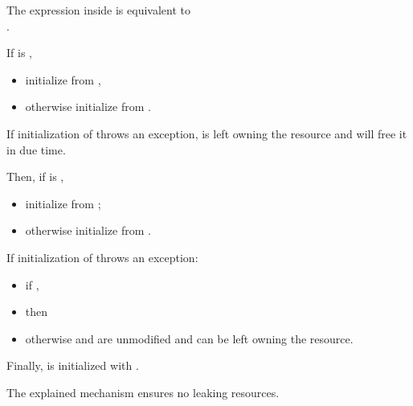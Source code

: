 \documentclass[ebook,11pt,article]{memoir}
\begin{document}
\begin{itemdescr}
\pnum
\remarks
The expression inside  is equivalent to \\
 \tcode{\&\&} .

\pnum
\effects If  is , 
\begin{itemize}
\item
initialize  from 
, %
\item otherwise initialize  from .  
\end{itemize}

\pnum
\begin{note}
If initialization of  throws an exception,  is left owning the resource and will free it in due time.
\end{note}

\pnum
Then, 
if  is ,
\begin{itemize}
\item initialize  from ;
\item otherwise initialize  from . 
\end{itemize}

\pnum
If initialization of  throws an exception: 
\begin{itemize}
\item
if , 
\item
then  
\item
otherwise  and  are unmodified 
and  can be left owning the resource. 
\end{itemize}

\pnum
Finally,  is initialized with .

\pnum
\begin{note}
The explained mechanism ensures no leaking resources.
\end{note}
\end{itemdescr}

\end{document}
